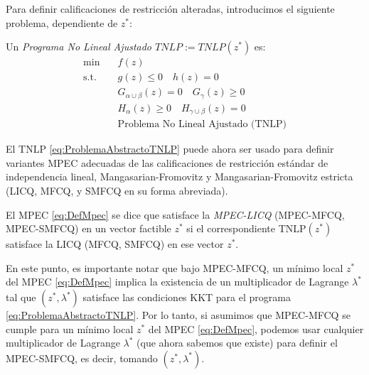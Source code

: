 Para definir calificaciones de restricción alteradas, introducimos el siguiente problema, dependiente de $z^*$:

\begin{definition}

Un \textit{Programa No Lineal Ajustado $TNLP := TNLP(z^*)$} es:
\begin{equation}
\begin{aligned} 
\min \quad & f(z) \\
\text{s.t.} \quad & g(z) \leq 0 \quad h(z) = 0  \\
& G_{\alpha \cup \beta}(z) = 0 \quad G_{\gamma}(z) \geq 0  \\
& H_{\alpha}(z) \geq 0 \quad H_{\gamma \cup \beta}(z) = 0  \\
& \text{Problema No Lineal Ajustado (TNLP)}  
\end{aligned}
\label{eq:ProblemaAbstractoTNLP}
\end{equation}
    
\end{definition}

El TNLP \eqref{eq:ProblemaAbstractoTNLP} puede ahora ser usado para definir variantes MPEC adecuadas de las calificaciones de restricción estándar de independencia lineal, Mangasarian-Fromovitz y Mangasarian-Fromovitz estricta (LICQ, MFCQ, y SMFCQ en su forma abreviada).

\begin{definition}
El MPEC \eqref{eq:DefMpec} se dice que satisface la \textit{MPEC-LICQ} (MPEC-MFCQ, MPEC-SMFCQ) en un vector factible $z^*$ si el correspondiente TNLP$(z^*)$ satisface la LICQ (MFCQ, SMFCQ) en ese vector $z^*$.
\end{definition}
    
En este punto, es importante notar que bajo MPEC-MFCQ, un mínimo local $z^*$ del MPEC \eqref{eq:DefMpec} implica la existencia de un multiplicador de Lagrange $\lambda^*$ tal que $(z^*, \lambda^*)$ satisface las condiciones KKT para el programa \eqref{eq:ProblemaAbstractoTNLP}. Por lo tanto, si asumimos que MPEC-MFCQ se cumple para un mínimo local $z^*$ del MPEC \eqref{eq:DefMpec}, podemos usar cualquier multiplicador de Lagrange $\lambda^*$ (que ahora sabemos que existe) para definir el MPEC-SMFCQ, es decir, tomando $(z^*, \lambda^*)$.

